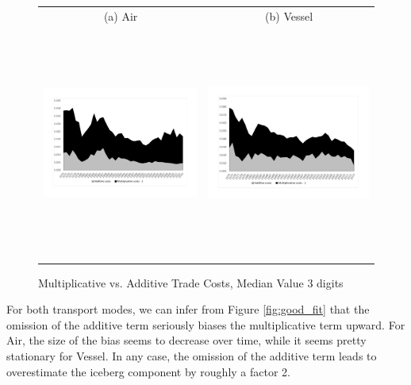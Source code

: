 \documentclass[a4paper,11pt]{article}
\begin{document}
\begin{figure}[H]
\caption{Multiplicative vs. Additive Trade Costs, Median Value 3 digits}\label{fig:mult_vs_add}
\begin{center}
\begin{tabular}{cc}
{\small (a) Air } & {\small (b) Vessel}\\
\includegraphics[width=3.5in, height=3in]{graph2a.pdf}
& \includegraphics[width=3.5in,height=3in]{graph2b.pdf} \\
\end{tabular}
\end{center}
\end{figure}



For both transport modes, we can infer from Figure \ref{fig:good_fit} that the omission of the additive term seriously biases the multiplicative term upward. For Air, the size of the bias seems to decrease over time, while it seems pretty stationary for Vessel. In any case, the omission of the additive term leads to overestimate the iceberg component by roughly a factor 2.
\end{document}
